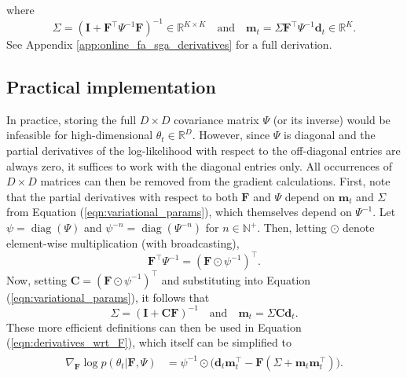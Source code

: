 \documentclass[msc,deptreport.inf]{infthesis} %
\newcommand{\matr}[1]{\mathbf{#1}}
\newcommand{\R}{\mathbb R}
\newcommand{\N}{\mathbb N}
\newcommand{\diag}{\mathop{\mathrm{diag}}}
\begin{document}
where
\begin{equation}\label{eqn:variational_params}
	\Sigma = (\matr{I} + \matr{F}^\intercal \Psi^{-1} \matr{F})^{-1} \in \R^{K \times K}
	\quad \text{and} \quad \matr{m}_t = \Sigma \matr{F}^\intercal \Psi^{-1} \matr{d}_t \in \R^K.
\end{equation}
See Appendix \ref{app:online_fa_sga_derivatives} for a full derivation.

\subsection{Practical implementation}

In practice, storing the full $D\times D$ covariance matrix $\Psi$ (or its inverse) would be infeasible for high-dimensional $\theta_t \in \R^D$. However, since $\Psi$ is diagonal and the partial derivatives of the log-likelihood with respect to the off-diagonal entries are always zero, it suffices to work with the diagonal entries only. All occurrences of $D \times D$ matrices can then be removed from the gradient calculations. First, note that the partial derivatives with respect to both $\matr{F}$ and $\Psi$ depend on $\matr{m}_t$ and $\Sigma$ from Equation (\ref{eqn:variational_params}), which themselves depend on  $\Psi^{-1}$. Let $\psi = \diag(\Psi)$ and $\psi^{-n} = \diag(\Psi^{-n})$ for $n \in \N^+$. Then, letting $\odot$ denote element-wise multiplication (with broadcasting),
\begin{equation}
	\matr{F}^\intercal \Psi^{-1} = (\matr{F} \odot \psi^{-1})^\intercal.
\end{equation}
Now, setting $\matr{C} =  (\matr{F} \odot \psi^{-1})^\intercal$ and substituting into Equation (\ref{eqn:variational_params}), it follows that 
\begin{equation}\label{eqn:efficient_m_and_sigma}
	\Sigma = (\matr{I} + \matr{C} \matr{F})^{-1} \quad \text{and} \quad \matr{m}_t = \Sigma \matr{C} \matr{d}_t.
\end{equation}
These more efficient definitions can then be used in Equation (\ref{eqn:derivatives_wrt_F}), which itself can be simplified to 
\begin{align}\label{eqn:efficient_derivatives_wrt_F}
\begin{split}
	\nabla_{\matr{F}} \log p(\theta_t | \matr{F}, \Psi) 
	& = \psi^{-1} \odot \big(\matr{d}_t \matr{m}_t^\intercal  - \matr{F}  (\Sigma + \matr{m}_t \matr{m}_t^\intercal) \big).
\end{split}
\end{align} 
\end{document}
